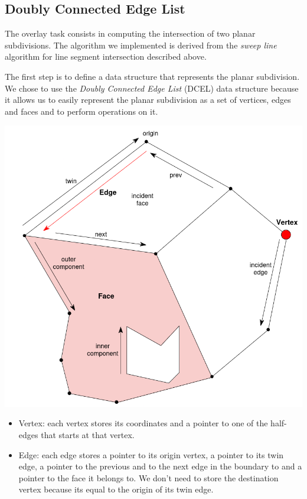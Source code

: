 \subsection{Doubly Connected Edge List}
\label{sec:dcel}
The overlay task consists in computing the intersection of two planar subdivisions. The algorithm we implemented is derived from the \textit{sweep line} algorithm for line segment intersection described above.

The first step is to define a data structure that represents the planar subdivision. We chose to use the \textit{Doubly Connected Edge List} (DCEL) data structure because it allows us to easily represent the planar subdivision as a set of vertices, edges and faces and to perform operations on it.
\hfill \break
\begin{minipage}{0.5\textwidth}
    \centering
    \includegraphics[width=\textwidth]{images/dcel.png}
\end{minipage}
\begin{minipage}{0.5\textwidth}
    \begin{itemize}
        \item Vertex: each vertex stores its coordinates and a pointer to one of the half-edges that starts at that vertex.
        \item Edge: each edge stores a pointer to its origin vertex, a pointer to its twin edge, a pointer to the previous and to the next edge in the boundary to and a pointer to the face it belongs to. We don't need to store the destination vertex because its equal to the origin of its twin edge.
    \end{itemize}
\end{minipage}

